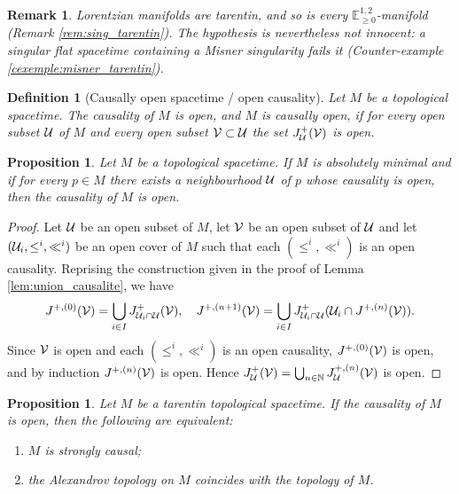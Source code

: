 \documentclass[a4paper,twoside]{article}
\newcommand{\mass}[1]{\mathbb{E}^{1,2}_{#1}}
\newtheorem{prop}[lem]{Proposition}
\newtheorem{defi}[lem]{Definition}
\newtheorem{rem}[lem]{Remark}
\begin{document}
\begin{rem}\label{rem:tarentin_exemples}
Lorentzian manifolds are tarentin, and so is every $\mass{\geq0}$-manifold (Remark
\ref{rem:sing_tarentin}). The hypothesis is nevertheless not innocent: a singular flat spacetime
containing a Misner singularity fails it (Counter-example \ref{cexemple:misner_tarentin}).
\end{rem}

\begin{defi}[Causally open spacetime / open causality]\label{def:causally_open_spacetime_open}
Let $M$ be a topological spacetime. The causality of $M$ is open, and $M$ is causally open, if for every open subset $\mathcal{U}$ of $M$
and every open subset $\mathcal V\subset \mathcal{U}$ the set $J^+_{\mathcal{U}}(\mathcal V)$ is open.
\end{defi}
\begin{prop}\label{prop:topological_spacetime_absolutely_minimal}Let $M$ be a topological spacetime. If $M$ is absolutely minimal and if for every $p\in M$ there
exists a neighbourhood $\mathcal{U}$ of $p$ whose causality is open, then
the causality of $M$ is open.
\end{prop}
\begin{proof}
Let $\mathcal{U}$ be an open subset of $M$,
let $\mathcal V$ be an open subset of $\mathcal{U}$ and let $(\mathcal{U}_i,\leq^i,\ll^i)$ be an open cover of $M$
such that each $(\leq^i,\ll^i)$ is an open causality.
Reprising the construction given in the proof
of Lemma \ref{lem:union_causalite}, we have
$$J^{+,(0)}(\mathcal V)= \bigcup_{i\in I} J^+_{\mathcal{U}_i\cap \mathcal{U}}(\mathcal V), \quad J^{+,(n+1)}(\mathcal V)=\bigcup_{i\in I} J^+_{\mathcal{U}_i\cap \mathcal{U}}(\mathcal{U}_i\cap J^{+,(n)}(\mathcal V)).$$
Since $\mathcal V$ is open and each $(\leq^i,\ll^i)$ is an open causality, $J^{+,(0)}(\mathcal V)$ is open, and by induction $J^{+,(n)}(\mathcal V)$
is open. Hence $J^+_{\mathcal{U}}(\mathcal V)=\bigcup_{n\in \mathbb{N}} J^{+,(n)}_{\mathcal{U}}(\mathcal V)$ is open.
\end{proof}

\begin{prop}\label{prop:tarentin_topological_spacetime_causality} Let $M$ be a tarentin topological spacetime. If the causality of $M$ is open, then the following are equivalent:
\begin{enumerate}[label=(\roman*)]
\item $M$ is strongly causal;
\item the Alexandrov topology on $M$ coincides with the topology of $M$.
\end{enumerate}
\end{prop}
\end{document}
